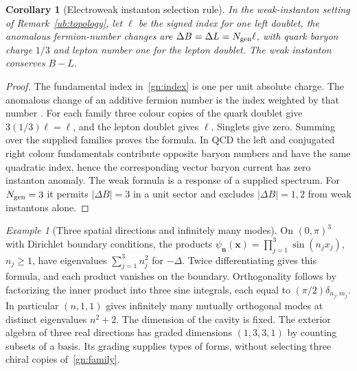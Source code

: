 \documentclass[aps,pra,onecolumn,superscriptaddress,nofootinbib,10pt]{revtex4-2}
\newtheorem{corollary}[theorem]{Corollary}
\theoremstyle{definition}
\theoremstyle{remark}
\newtheorem{example}[theorem]{Example}
\begin{document}
\begin{corollary}[Electroweak instanton selection rule]\label{gn:bl}
In the weak-instanton setting of Remark~\ref{ub:topology}, let $\ell$
be the signed index for one left
doublet, the anomalous fermion-number changes are
$\Delta B=\Delta L=N_{\rm gen}\ell$, with quark baryon charge
$1/3$ and lepton number one for the lepton doublet. The weak
instanton conserves $B-L$.
\end{corollary}
\begin{proof}
The fundamental index in~\eqref{gn:index} is one per unit absolute
charge. The anomalous change of an additive fermion number is
the index weighted by that number \cite{ub:thooft}.
For each family three colour copies of the quark doublet give
$3(1/3)\ell=\ell$, and the lepton doublet gives $\ell$. Singlets
give zero. Summing over the supplied families proves the formula.
In QCD the left and conjugated right colour fundamentals contribute
opposite baryon numbers and have the same quadratic index, hence
the corresponding vector baryon current has zero instanton
anomaly. The weak formula is a response of a supplied spectrum.
For $N_{\rm gen}=3$ it permits $|\Delta B|=3$ in a unit sector and
excludes $|\Delta B|=1,2$ from weak instantons alone.
\end{proof}

\begin{example}[Three spatial directions and infinitely many modes]\label{gn:cavity}
On $(0,\pi)^3$ with Dirichlet boundary conditions, the products
$\psi_{\mathbf n}(\mathbf x)=\prod_{j=1}^3\sin(n_jx_j)$,
$n_j\ge1$, have eigenvalues $\sum_{j=1}^3 n_j^2$ for $-\Delta$.
Twice differentiating gives this formula, and each product vanishes
on the boundary. Orthogonality follows by factorizing the inner
product into three sine integrals, each equal to
$(\pi/2)\delta_{n_j,m_j}$. In particular $(n,1,1)$ gives infinitely
many mutually orthogonal modes at distinct eigenvalues $n^2+2$.
The dimension of the cavity is fixed. The exterior algebra of
three real directions has graded dimensions $(1,3,3,1)$ by
counting subsets of a basis. Its grading supplies types of
forms, without selecting three chiral copies of~\eqref{gn:family}.
\end{example}
\end{document}
